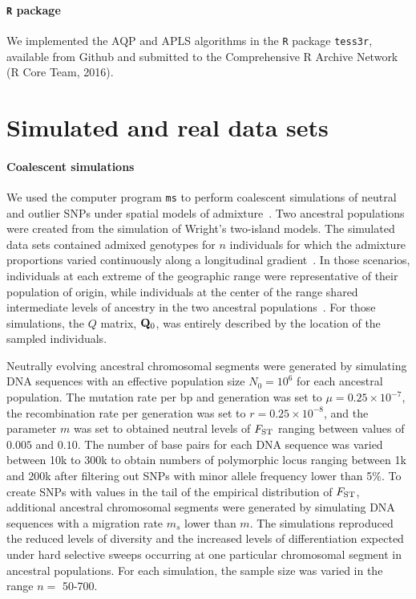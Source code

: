 \paragraph{{\tt R} package} We implemented the AQP and APLS algorithms in the {\tt R} package {\tt tess3r}, available from Github and submitted to the Comprehensive R Archive Network (R Core Team, 2016).  


\section{Simulated and real data sets}
\paragraph{Coalescent simulations} We used the computer program {\tt ms} to perform coalescent simulations of neutral and outlier SNPs under spatial models of admixture~\citep{Hudson2002}. Two ancestral populations were created from the simulation of Wright\rq{}s two-island models. The simulated data sets contained admixed genotypes for $n$ individuals for which the admixture proportions varied continuously along a longitudinal gradient~\citep{Durand2009, Francois2010}. In those scenarios, individuals at each extreme of the geographic range were representative of their population of origin, while individuals at the center of the range shared intermediate levels of ancestry in the two ancestral populations~\citep{Caye2016}. For those simulations, the $Q$ matrix, ${\bf Q}_0$, was entirely described by the location of the sampled individuals.


Neutrally evolving ancestral chromosomal segments were generated by simulating DNA sequences with an effective  population size $N_0 = 10^6$ for each ancestral population. The mutation rate per bp and generation was set to $\mu = 0.25 \times 10^{-7}$, the recombination rate per generation was set to $r = 0.25 \times 10^{-8}$, and the parameter $m$ was set to obtained neutral levels of $F_{\rm ST}$ ranging between values of $0.005$ and $0.10$. The number of base pairs for each DNA sequence was varied between 10k to 300k to obtain numbers of polymorphic locus ranging between 1k and 200k after filtering out SNPs with minor allele frequency lower than 5$\%$.  To create SNPs with values in the tail of the empirical distribution of $F_{\rm ST}$,  additional ancestral chromosomal segments were generated by simulating DNA sequences with a migration rate $m_s$ lower than $m$. The simulations reproduced the reduced levels of diversity and the increased levels of differentiation expected under hard selective sweeps occurring at one particular chromosomal segment in ancestral populations.  For each simulation, the sample size  was varied in the range $n =$ 50-700.

